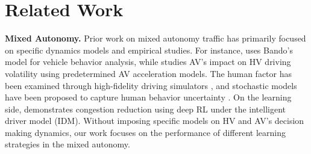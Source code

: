 \section{Related Work}

{\bf Mixed Autonomy.} Prior work on mixed autonomy traffic has primarily focused on specific dynamics models and empirical studies. For instance, \cite{zhu2018analysis} uses Bando's model for vehicle behavior analysis, while \cite{mahdinia2021integration} studies AV's impact on HV driving volatility using predetermined AV acceleration models. The human factor has been examined through high-fidelity driving simulators \cite{sharma2018human}, and stochastic models have been proposed to capture human behavior uncertainty \cite{zheng2020analyzing}. On the learning side, \cite{wu2017flow} demonstrates congestion reduction using deep RL under the intelligent driver model (IDM). Without imposing specific models on HV and AV's decision making dynamics, our work focuses on the performance of different learning strategies in the mixed autonomy.


